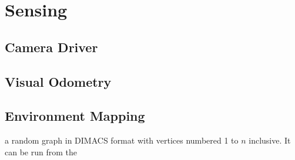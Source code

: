 \documentclass{l4proj}
\begin{document}
\chapter{Sensing}

\section{Camera Driver}
\section{Visual Odometry}
\section{Environment Mapping}

%

a random graph in DIMACS format with vertices numbered 1 to $n$ inclusive. It can be run from the %


%
%
\end{document}
